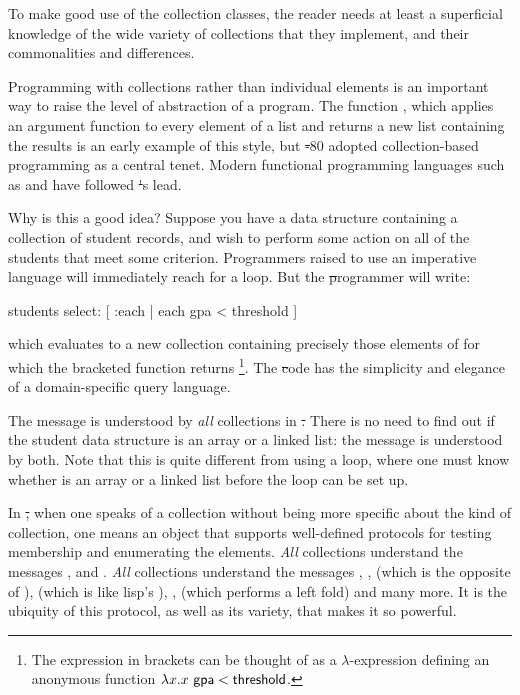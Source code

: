 \documentclass[a4paper,10pt,twoside]{book}
\begin{document}
To make good use of the collection classes, the reader needs at least a superficial knowledge of the wide variety of collections that they implement, and their commonalities and differences.

Programming with collections rather than individual elements is an important way to raise the level of abstraction of a program. 
The  function , which applies an argument function to every element of a list and returns a new list containing the results is an early example of this style, but \st-80 adopted collection-based programming as a central tenet.  Modern functional programming languages such as  and  have followed \st's lead.

Why is this a good idea?
Suppose you have a data structure containing a collection of student records, and wish to perform some action on all of the students that meet some criterion.  Programmers raised to use an imperative language will immediately reach for a loop.  But the \st programmer will write:
\begin{code}{}
students select: [ :each | each gpa < threshold ]
\end{code}
\noindent
which evaluates to a new collection containing precisely those elements of  for which the bracketed function returns \footnote{The expression in brackets can be thought of as a $\lambda$-expression defining an anonymous function $\lambda x. x~{\sf gpa} < {\sf threshold}$.
}.
The \st code has the simplicity and elegance of a domain-specific query language.

The message  is understood by \emph{all} collections in \st.  There is no need to find out if the student data structure is an array or a linked list: the  message is understood by both.  Note that this is quite different from using a loop, where one must know whether  is an array or a linked list before the loop can be set up.

In \st, when one speaks of a collection without being more specific about the kind of collection, one means an object that supports well-defined protocols for testing membership and enumerating the elements.  \emph{All} collections understand the  messages \mbox{,}  and \mbox{.}  \emph{All} collections understand the  messages , ,  (which is the opposite of ),  (which is like lisp's ), ,  (which performs a left fold) and many more.
It is the ubiquity of this protocol, as well as its variety, that makes it so powerful.
\end{document}
